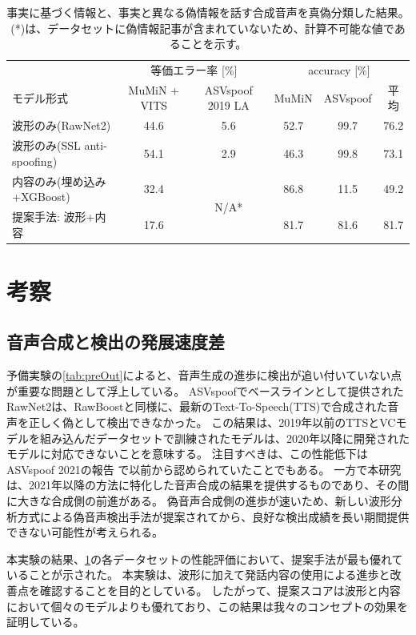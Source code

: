\begin{landscape}
\begin{table}[p]
    \caption{事実に基づく情報と、事実と異なる偽情報を話す合成音声を真偽分類した結果。(*)は、データセットに偽情報記事が含まれていないため、計算不可能な値であることを示す。}
    \centering
    \begin{tabular}{lcc|ccc}\hline
         & \multicolumn{2}{c}{等価エラー率 [\%]} & \multicolumn{3}{c}{accuracy [\%]}\\
       モデル形式 & MuMiN + VITS & ASVspoof 2019 LA & MuMiN & ASVspoof & 平均\\\hline\hline
       波形のみ(RawNet2) & 44.6 & 5.6 & 52.7 & 99.7 & 76.2\\
       波形のみ(SSL anti-spoofing) & 54.1 & 2.9 & 46.3 & 99.8 & 73.1\\\hline
       内容のみ(埋め込み+XGBoost) & 32.4 & \multirow{2}{*}{N/A*} & 86.8 & 11.5 & 49.2\\
       提案手法: 波形+内容 & 17.6 & & 81.7 & 81.6 & 81.7 \\\hline
    \end{tabular}
    \label{tab:result}
\end{table}
\end{landscape}

\section{考察}\label{sec:cnt_evl}
\subsection{音声合成と検出の発展速度差}
予備実験の\cref{tab:preOut}によると、音声生成の進歩に検出が追い付いていない点が重要な問題として浮上している。
ASVspoofでベースラインとして提供されたRawNet2は、RawBoostと同様に、最新のText-To-Speech(TTS)で合成された音声を正しく偽として検出できなかった。
この結果は、2019年以前のTTSとVCモデルを組み込んだデータセットで訓練されたモデルは、2020年以降に開発されたモデルに対応できないことを意味する。
注目すべきは、この性能低下はASVspoof 2021の報告 \cite{yamagishi21_asvspoof}で以前から認められていたことでもある。
一方で本研究は、2021年以降の方法に特化した音声合成の結果を提供するものであり、その間に大きな合成側の前進がある。
偽音声合成側の進歩が速いため、新しい波形分析方式による偽音声検出手法が提案されてから、良好な検出成績を長い期間提供できない可能性が考えられる。

本実験の結果、\cref{tab:result}の各データセットの性能評価において、提案手法が最も優れていることが示された。
本実験は、波形に加えて発話内容の使用による進歩と改善点を確認することを目的としている。 
したがって、提案スコアは波形と内容において個々のモデルよりも優れており、この結果は我々のコンセプトの効果を証明している。

